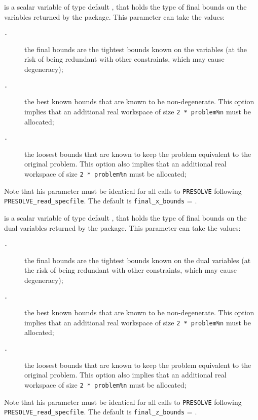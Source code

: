 \documentclass{galahad}
\newcommand{\packagename}{PRESOLVE}
\newcommand{\sym}{\tt\small}
\begin{document}
\begin{description}
 is a scalar variable of type default \integer, that
holds the type of final bounds on the variables returned by the
package.  This parameter can take the values:
\begin{description}
\item[\sym \galsymtightest.] the final bounds are the tightest bounds
                known on the variables (at the risk of
                being redundant with other constraints,
                which may cause degeneracy);
\item[\sym \galsymnondegenerate.] the best known bounds that are known to
                      be non-degenerate. This option implies
                      that an additional real workspace of size
                      {\tt 2 * problem\%n} must be allocated;
\item[\sym \galsymloosest.] the loosest bounds that are known to
               keep the problem equivalent to the
               original problem. This option also 
               implies that an additional real workspace of size 
               {\tt 2 * problem\%n} must be allocated;
\end{description}
Note that his parameter must be identical for all calls to 
{\tt \packagename} following {\tt \packagename\_read\_specfile}.
The default is {\tt final\_x\_bounds} = {\sym \galsymtightest}.

 is a scalar variable of type default \integer, that
holds the type of final bounds on the dual variables returned by 
the package.  This parameter can take the values:
\begin{description}
\item[\sym \galsymtightest.] the final bounds are the tightest bounds
                known on the dual variables (at the risk of
                being redundant with other constraints,
                which may cause degeneracy);
\item[\sym \galsymnondegenerate.] the best known bounds that are known to
                      be non-degenerate. This option implies
                      that an additional real workspace of size
                      {\tt 2 * problem\%n} must be allocated;
\item[\sym \galsymloosest.] the loosest bounds that are known to
               keep the problem equivalent to the
               original problem. This option also 
               implies that an additional real workspace of size
               {\tt 2 * problem\%n} must be allocated;
\end{description}
Note that his parameter must be identical for all calls to 
{\tt \packagename} following {\tt \packagename\_read\_specfile}.
The default is {\tt final\_z\_bounds} = {\sym \galsymtightest}.
         

\end{description}
\end{document}
